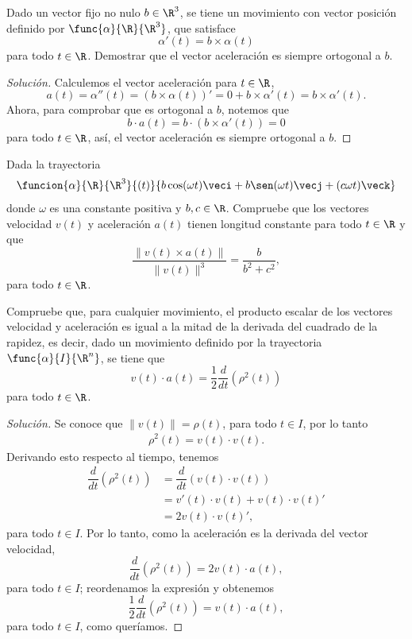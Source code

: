\documentclass[a4,11pt]{aleph-notas}
\begin{document}
\begin{ejer}
Dado un  vector fijo no nulo $b\in\R^3$, se tiene un movimiento con vector posición definido por $\func{\alpha}{\R}{\R^3}$, que satisface
    \[
        \alpha'(t) = b\times \alpha(t)
    \]
    para todo $t\in\R$. Demostrar que el vector aceleración es siempre ortogonal a $b$.
\end{ejer}

\begin{proof}[Solución]
Calculemos el vector aceleración para $t\in\R$,
    \[
        a(t)=\alpha''(t)=(b\times \alpha(t))'=0+b\times \alpha'(t)=b\times \alpha'(t).
    \]
    Ahora, para comprobar que es ortogonal a $b$, notemos que
    \[
        b\cdot a(t) = b\cdot (b\times \alpha'(t)) = 0
    \]
    para todo $t\in\R$, así, el vector aceleración es siempre ortogonal a $b$.
\end{proof}

\begin{ejer}
Dada la trayectoria
	\[
        \funcion{\alpha}{\R}{\R^3}{(t)}{b\cos(\omega t)\veci+b\sen(\omega t)\vecj +(c\omega t)\veck}
    \]
    donde $\omega$ es una constante positiva y $b,c\in \R$. Compruebe que los vectores velocidad $v(t)$ y aceleración $a(t)$ tienen longitud constante para todo $t\in \R$ y que
    \[
        \frac{\|v(t)\times a(t)\|}{\|v(t)\|^3}=\frac{b}{b^2+c^2},
    \]
    para todo $t\in \R$.
\end{ejer}

\begin{ejer}
Compruebe que, para cualquier movimiento, el producto escalar de los vectores velocidad y aceleración es igual a la mitad de la derivada del cuadrado de la rapidez, es decir, dado un movimiento definido por la trayectoria $\func{\alpha}{I}{\R^n}$, se tiene que
	\[
        v(t)\cdot a(t)=\dfrac{1}{2} \dfrac{d}{dt} (\rho^2(t))
    \]
    para todo $t\in\R$.
\end{ejer}

\begin{proof}[Solución]
Se conoce que $\|v(t)\|=\rho(t)$, para todo $t\in I$, por lo tanto
    \begin{align*}
        \rho^2(t) = v(t)\cdot v(t).
	\end{align*}
    Derivando esto respecto al tiempo, tenemos
    \begin{align*}
		\dfrac{d}{dt} (\rho^2(t))
		    & =\dfrac{d}{dt} (v(t) \cdot v(t)) \\
            & = v'(t) \cdot v(t) + v(t) \cdot v(t)'\\
            & = 2 v(t) \cdot v(t)',
	\end{align*}
	para todo $t\in I$. Por lo tanto, como la aceleración es la derivada del vector velocidad, 
	\[
        \dfrac{d}{dt} (\rho^2(t))=2v(t)\cdot a(t),
   	\]
	para todo $t\in I$; reordenamos la expresión y obtenemos
	\[
   		\dfrac{1}{2} \dfrac{d}{dt} (\rho^2(t))=v(t)\cdot a(t),
    \]
    para todo $t\in I$, como queríamos.
\end{proof}
\end{document}
